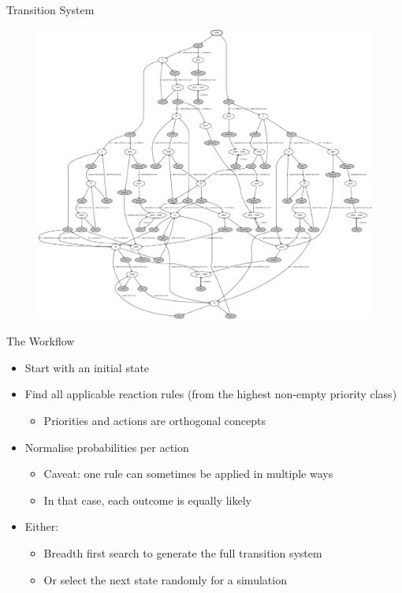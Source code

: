 \documentclass{beamer}
\begin{document}
\begin{frame}{Transition System}
  \begin{figure}
    \centering
    \includegraphics[scale=0.17]{../models/agent1/ts.pdf}
  \end{figure}
\end{frame}

\begin{frame}{The Workflow}
  \begin{itemize}
  \item Start with an initial state
    \pause
  \item Find all applicable reaction rules (from the highest non-empty priority
    class)
    \begin{itemize}
    \item Priorities and actions are orthogonal concepts
    \end{itemize}
    \pause
  \item Normalise probabilities per action
    \pause
    \begin{itemize}
    \item Caveat: one rule can sometimes be applied in multiple ways
    \item In that case, each outcome is equally likely
    \end{itemize}
    \pause
  \item Either:
    \begin{itemize}
    \item Breadth first search to generate the full transition system
    \item Or select the next state randomly for a simulation
    \end{itemize}
  \end{itemize}
\end{frame}
\end{document}
